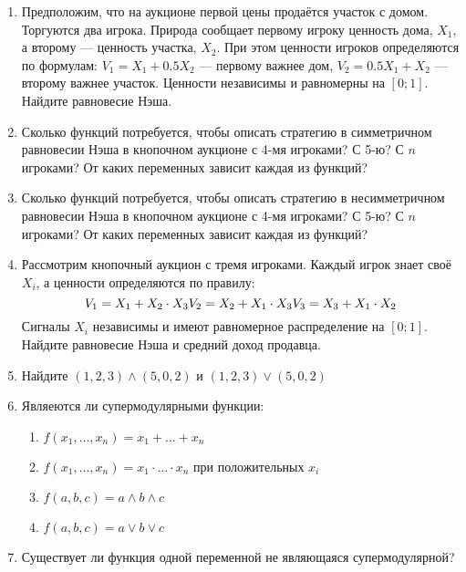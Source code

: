 \begin{enumerate}
\begin{enumerate}
\end{enumerate}

\item Предположим, что на аукционе первой цены продаётся участок с домом. Торгуются два игрока. Природа сообщает первому игроку ценность дома, $ X_{1} $, а второму — ценность участка, $ X_{2} $. При этом ценности игроков определяются по формулам: $ V_{1}=X_{1}+0.5X_{2} $ — первому важнее дом, $ V_{2}=0.5X_{1}+X_{2} $ — второму важнее участок. Ценности независимы и равномерны на $ [0;1] $. Найдите равновесие Нэша.

\item Сколько функций потребуется, чтобы описать стратегию в симметричном равновесии Нэша в кнопочном аукционе с 4-мя игроками? С 5-ю? С $ n $ игроками?  От каких переменных зависит каждая из функций?

\item Сколько функций потребуется, чтобы описать стратегию в несимметричном равновесии Нэша в кнопочном аукционе с 4-мя игроками? С 5-ю? С $ n $ игроками? От каких переменных зависит каждая из функций?

\item Рассмотрим кнопочный аукцион с тремя игроками. Каждый игрок знает своё $ X_{i} $, а ценности определяются по правилу:
\begin{equation}
V_{1}=X_{1}+X_{2}\cdot X_{3} \\
V_{2}=X_{2}+X_{1}\cdot X_{3} \\
V_{3}=X_{3}+X_{1}\cdot X_{2} \\
\end{equation}
Сигналы $ X_{i} $ независимы и имеют равномерное распределение на $ [0;1] $. Найдите равновесие Нэша и средний доход продавца.

\item Найдите $ (1,2,3)\wedge (5,0,2) $ и $ (1,2,3)\vee (5,0,2) $

\item Являеются ли супермодулярными функции:
\begin{enumerate}
\item $ f(x_{1},\ldots,x_{n})=x_{1}+\ldots+x_{n} $
\item $ f(x_{1},\ldots,x_{n})=x_{1}\cdot \ldots \cdot x_{n} $ при положительных $ x_{i} $
\item $ f(a,b,c)=a\wedge b\wedge c $
\item $ f(a,b,c)=a\vee b\vee c $
\end{enumerate}

\item Существует ли функция одной переменной не являющаяся супермодулярной?


\end{enumerate}
